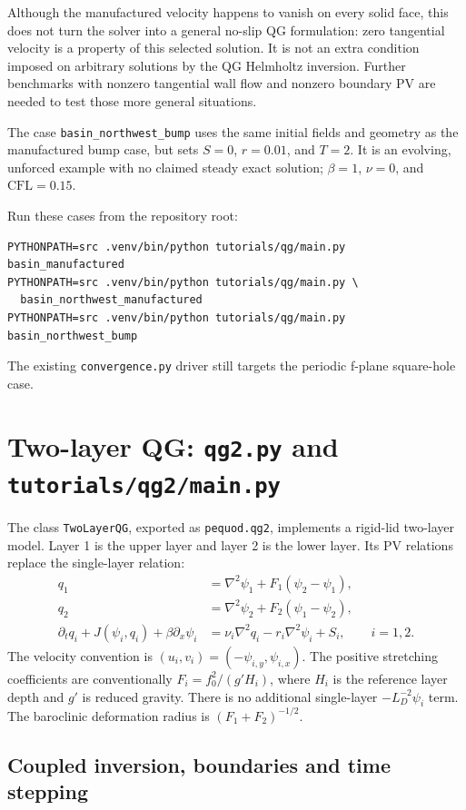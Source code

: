 \documentclass[11pt]{article}
\newcommand{\lap}{\nabla^2}
\begin{document}
Although the manufactured velocity happens to vanish on every solid face,
this does not turn the solver into a general no-slip QG formulation:
zero tangential velocity is a property of this selected solution.
It is not an extra condition imposed on arbitrary solutions by the QG
Helmholtz inversion.  Further benchmarks with nonzero tangential wall flow
and nonzero boundary PV are needed to test those more general situations.

The case \texttt{basin\_northwest\_bump} uses the same initial fields and
geometry as the manufactured bump case, but sets $S=0$, $r=0.01$,
and $T=2$.  It is an evolving, unforced example with no claimed steady
exact solution; $\beta=1$, $\nu=0$, and $\mathrm{CFL}=0.15$.

Run these cases from the repository root:
\begin{verbatim}
PYTHONPATH=src .venv/bin/python tutorials/qg/main.py basin_manufactured
PYTHONPATH=src .venv/bin/python tutorials/qg/main.py \
  basin_northwest_manufactured
PYTHONPATH=src .venv/bin/python tutorials/qg/main.py basin_northwest_bump
\end{verbatim}
The existing \texttt{convergence.py} driver still targets the periodic
f-plane square-hole case.

\section{Two-layer QG: \texttt{qg2.py} and \texttt{tutorials/qg2/main.py}}

The class \texttt{TwoLayerQG}, exported as \texttt{pequod.qg2}, implements
a rigid-lid two-layer model. Layer 1 is the upper layer and layer 2 is the
lower layer. Its PV relations replace the single-layer relation:
\begin{align}
 q_1&=\lap\psi_1+F_1(\psi_2-\psi_1),\\
 q_2&=\lap\psi_2+F_2(\psi_1-\psi_2),\\
 \partial_t q_i+J(\psi_i,q_i)+\beta\partial_x\psi_i
   &=\nu_i\lap q_i-r_i\lap\psi_i+S_i,\qquad i=1,2.
\end{align}
The velocity convention is $(u_i,v_i)=(-\psi_{i,y},\psi_{i,x})$.
The positive stretching coefficients are conventionally
$F_i=f_0^2/(g'H_i)$, where $H_i$ is the reference layer depth and $g'$
is reduced gravity.  There is no additional single-layer
$-L_D^{-2}\psi_i$ term. The baroclinic deformation radius is
$(F_1+F_2)^{-1/2}$.

\subsection{Coupled inversion, boundaries and time stepping}
\end{document}

